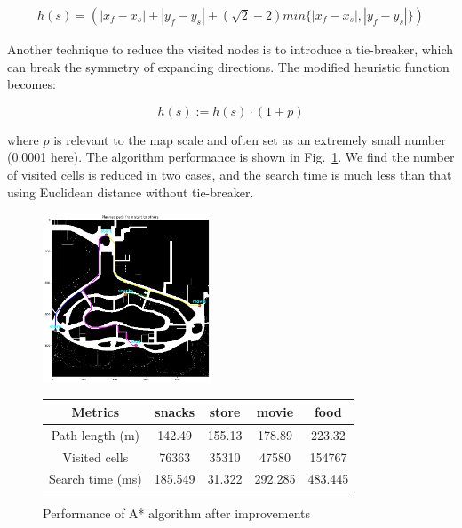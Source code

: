 \documentclass[hyperref]{article}
\theoremstyle{nonumberplain}
\begin{document}
\begin{equation}
\begin{aligned}
h(s) = (\left | x_{f}-x_{s} \right | + \left | y_{f}-y_{s} \right | + (\sqrt{2}-2)min\{\left | x_{f}-x_{s} \right |, \left | y_{f}-y_{s} \right |\})
\label{eq2}
\end{aligned}
\end{equation}

Another technique to reduce the visited nodes is to introduce a tie-breaker, which can break the symmetry of expanding directions. The modified heuristic function becomes:

\begin{equation}
h(s) := h(s)\cdot(1 + p)
\label{eq3}
\end{equation}

where $p$ is relevant to the map scale and often set as an extremely small number (0.0001 here). The algorithm performance is shown in Fig.~\ref{fig4}. We find the number of visited cells is reduced in two cases, and the search time is much less than that using Euclidean distance without tie-breaker.  


\begin{figure}[H]
	\begin{minipage}{.4\linewidth}
		\centering
		\includegraphics[width=5cm]{start_to_others_diagonal.png}
	\end{minipage}
	\begin{minipage}{.6\linewidth}
		\centering
		\begin{tabular}{|c|c|c|c|c|}
			\hline
			Metrics  &snacks &store &movie &food \\
			\hline
			Path length (m) &142.49 &155.13 &178.89 &223.32 \\
			Visited cells &76363 &35310 &47580 &154767\\
			Search time (ms) &185.549 &31.322 &292.285 &483.445 \\ 
			\hline
		\end{tabular}
	\end{minipage}
	\caption{Performance of A* algorithm after improvements}
	\label{fig4}
\end{figure}
\end{document}
